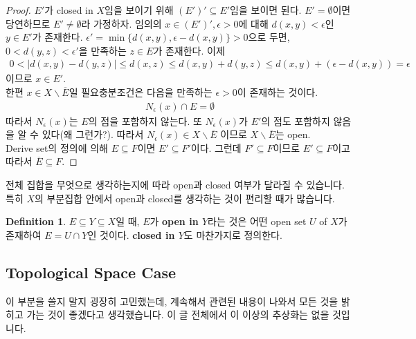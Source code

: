 \documentclass[12pt]{article}
\theoremstyle{definition}
\newtheorem{defn}[thm]{Definition}
\def\eps{\epsilon}
\newcommand{\abs}[1]{\left\vert#1\right\vert}
\begin{document}
	\begin{proof}
		\(E'\)가 closed in \(X\)임을 보이기 위해 \((E')' \subseteq E'\)임을 보이면 된다. \(E' = \emptyset\)이면 당연하므로 \(E' \neq \emptyset\)라 가정하자. 임의의 \(x \in (E')', \eps > 0\)에 대해 \(d(x, y) < \eps\)인 \(y \in E'\)가 존재한다. \(\eps' = \min\{d(x, y), \eps - d(x, y)\} > 0\)으로 두면, \(0 < d(y, z) < \eps'\)을 만족하는 \(z \in E\)가 존재한다. 이제
		\begin{gather*}
			0 < \abs{d(x, y) - d(y, z)} \le  d(x, z) \le d(x, y) + d(y, z) \le d(x, y) + (\eps - d(x, y)) = \eps
		\end{gather*}
		이므로 \(x \in E'\).\\
		한편 \(x \in X \backslash \overline{E}\)일 필요충분조건은 다음을 만족하는 \(\eps > 0\)이 존재하는 것이다.
		\begin{gather*}
			N_\eps (x) \cap E = \emptyset
		\end{gather*}
		따라서 \(N_\eps (x)\)는 \(E\)의 점을 포함하지 않는다. 또 \(N_\eps (x)\)가 \(E'\)의 점도 포함하지 않음을 알 수 있다(왜 그런가?). 따라서 \( N_\eps (x) \in X \backslash \overline{E}\) 이므로 \(X \backslash \overline{E}\)는 open.\\
		Derive set의 정의에 의해 \(E \subseteq F\)이면 \(E' \subseteq F'\)이다. 그런데 \(F' \subseteq F\)이므로 \(E' \subseteq F\)이고 따라서 \(\overline{E} \subseteq F\).
	\end{proof}

전체 집합을 무엇으로 생각하는지에 따라 open과 closed 여부가 달라질 수 있습니다. 특히 \(X\)의 부분집합 안에서 open과 closed를 생각하는 것이 편리할 때가 많습니다.

	\begin{defn}
		\(E \subseteq Y \subseteq X\)일 때, \(E\)가 \textbf{open in \(Y\)}라는 것은 어떤 open set \(U\) of \(X\)가 존재하여 \(E = U \cap Y\)인 것이다. \textbf{closed in \(Y\)}도 마찬가지로 정의한다.
	\end{defn}

\subsection{Topological Space Case} \label{sec top}

이 부분을 쓸지 말지 굉장히 고민했는데, 계속해서 관련된 내용이 나와서 모든 것을 밝히고 가는 것이 좋겠다고 생각했습니다. 이 글 전체에서 이 이상의 추상화는 없을 것입니다.
\end{document}
